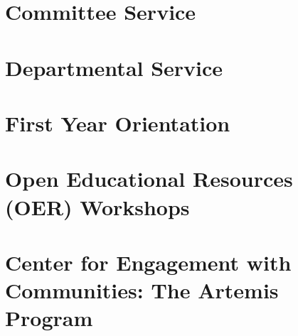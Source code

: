 \documentclass[../../main.tex]{subfiles}
\begin{document}
\label{sec:service}

\section{Committee Service}

%

\begin{flushleft}

\end{flushleft}

\section{Departmental Service}

%

\begin{flushleft}

\end{flushleft}

\section{First Year Orientation}

%

\begin{flushleft}

\end{flushleft}

\section{Open Educational Resources (OER) Workshops}

%

\begin{flushleft}

\end{flushleft}

\section{Center for Engagement with Communities: The Artemis Program}
\end{document}
